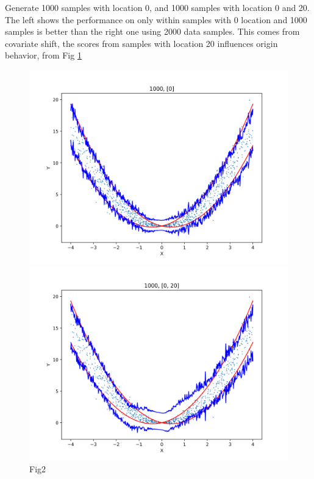 \documentclass[12pt, a4paper, oneside]{article}
\begin{document}
    Generate 1000 samples with location 0, and 1000 samples with location 0 and 20. The left shows the performance on only within samples with 0 location and 1000 samples is better than the right one using 2000 data samples. This comes from covariate shift, the scores from samples with location 20 influences origin behavior, from Fig \ref{Fig2}
    \begin{figure}[htbp]
        \centering
        \begin{minipage}{0.495\linewidth}
            \centering
            \includegraphics[width=0.98\linewidth]{fig/Ex1_1/0.png}
        \end{minipage}
        \begin{minipage}{0.495\linewidth}
            \centering
            \includegraphics[width=0.98\linewidth]{fig/Ex1_1/0_20.png}
        \end{minipage}
        \caption{Fig2}
        \label{Fig2}
    \end{figure}
\end{document}
